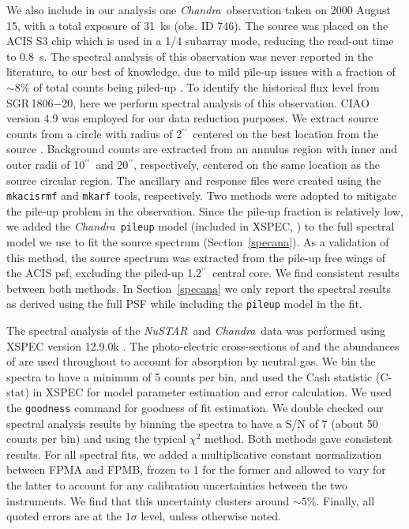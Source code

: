 \documentclass[twocolumn]{aastex6}
\newcommand {\chandra} {\textsl{Chandra}}
\newcommand {\nustar} {\textsl{NuSTAR}}
\def \arcsec {\hbox{$^{\prime\prime}$}}
\def \src {SGR\,1806$-$20}
\begin{document}
We also include in our analysis one \chandra\ observation taken on
2000 August 15, with a total exposure of 31~ks (obs. ID 746). The
source was placed on the ACIS S3 chip which is used in a 1/4 subarray
mode, reducing the read-out time to 0.8~s. The spectral analysis of
this observation was never reported in the literature, to our best of
knowledge, due to mild pile-up issues with a fraction of $\sim8\%$ of
total counts being piled-up \citep{kaplan02ApJ:1806}. To identify
the historical flux level from \src, here we perform spectral analysis of
this observation.  CIAO version 4.9 was employed for our data reduction
purposes. We extract source counts from a circle with radius of
2\arcsec\ centered on the best location from the source \citep{
  kaplan02ApJ:1806}. Background counts are extracted from an annulus
region with inner and outer radii of 10\arcsec\ and 20\arcsec,
respectively, centered on the same location as the source circular
region.  The ancillary and response files were created using the 
{\tt mkacisrmf} and {\tt mkarf} tools, respectively.  Two
methods were adopted to mitigate the pile-up problem in the observation. 
Since the pile-up fraction is relatively low, we added the \chandra\
\texttt{pileup} model (included in XSPEC, \citealt{davis01apjpile}) to
the full spectral model we use to fit the source spectrum
(Section~\ref{specana}). As a validation of this method, the source spectrum
was extracted from the pile-up free wings of the ACIS psf,
excluding the piled-up 1.2\arcsec\ central core. We find consistent
results between both methods. In Section~\ref{specana} we only report
the spectral results as derived using the full PSF while including the
\texttt{pileup} model in the fit.

The spectral analysis of the \nustar\ and \chandra\ data was 
performed using XSPEC version 12.9.0k \citep{arnaud96conf}. 
The photo-electric cross-sections of \citet{
  verner96ApJ:crossSect} and the abundances of \citet{wilms00ApJ} are
used throughout to account for absorption by neutral gas. We bin the
spectra to have a minimum of 5 counts per bin, and used the Cash
statistic (C-stat) in XSPEC for model parameter estimation and error
calculation. We used the \texttt{goodness} command for goodness of fit
estimation. We double checked our spectral analysis results by binning
the spectra to have a S/N of 7 (about 50 counts per bin) and using
the typical $\chi^2$ method. Both methods gave consistent results. For
all spectral fits, we added a multiplicative constant normalization
between FPMA and FPMB, frozen to 1 for the former and allowed to vary
for the latter to account for any calibration uncertainties between
the two instruments. We find that this uncertainty clusters around
$\sim5\%$. Finally, all quoted errors are at the $1\sigma$
level, unless otherwise noted.
\end{document}
